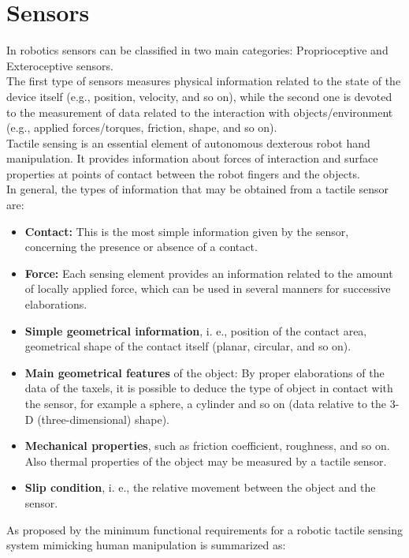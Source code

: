 \documentclass[a4paper, 10pt, conference]{ieeeconf}      %
\begin{document}
\section{\textbf{Sensors}}
In robotics sensors can be classified in two main categories: Proprioceptive and Exteroceptive sensors.\\
The first type of sensors measures physical information related to the state of the device itself (e.g., position, velocity, and so on), while the second one is devoted to the measurement of data related to the interaction with objects/environment (e.g., applied forces/torques, friction, shape, and so on).\\
Tactile sensing is an essential element of autonomous dexterous robot hand manipulation. It provides information about forces of interaction and surface properties at points of contact between the robot fingers and the objects.\\
In general, the types of information that may be obtained from a tactile sensor are:\\
\begin{itemize}
	\item \textbf{Contact:} This is the most simple information given by the sensor, concerning the presence or absence of a contact.
	\item \textbf{Force:} Each sensing element provides an information related to the amount of locally applied force, which can be used in several manners for successive elaborations.
	\item \textbf{Simple geometrical information}, i. e., position of the contact area, geometrical shape of the contact itself (planar, circular, and so on).
	\item \textbf{Main geometrical features} of the object: By proper elaborations of the data of the taxels, it is possible to deduce the type of object in contact with the sensor, for example a sphere, a cylinder and so on (data relative to the 3-D (three-dimensional) shape).
	\item \textbf{Mechanical properties}, such as friction coefficient, roughness, and so on. Also thermal properties of the object may be measured by a tactile sensor.
	\item \textbf{Slip condition}, i. e., the relative movement between the object and the sensor.
\end{itemize}
As proposed by \cite{yousef2011tactile} the minimum functional requirements for a robotic tactile sensing system mimicking human manipulation is summarized as:\\
\end{document}
